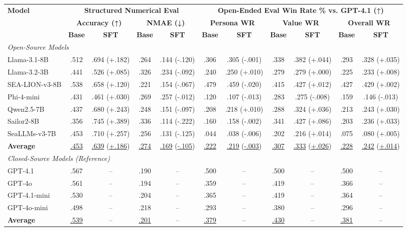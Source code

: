 \begin{tabular}{l|cc|cc|cc|cc|cc}
\toprule
\multirow{3}{*}{\textbf{Model}} & \multicolumn{4}{c|}{\textbf{Structured Numerical Eval}} & \multicolumn{6}{c}{\textbf{Open-Ended Eval Win Rate \% vs. GPT-4.1 (↑)}} \\
\cmidrule(lr){2-5} \cmidrule(lr){6-11}
& \multicolumn{2}{c|}{\textbf{Accuracy (↑)}} & \multicolumn{2}{c|}{\textbf{NMAE (↓)}} & \multicolumn{2}{c|}{\textbf{Persona WR}} & \multicolumn{2}{c|}{\textbf{Value WR}} & \multicolumn{2}{c}{\textbf{Overall WR}} \\
& \textbf{Base} & \textbf{SFT} & \textbf{Base} & \textbf{SFT} & \textbf{Base} & \textbf{SFT} & \textbf{Base} & \textbf{SFT} & \textbf{Base} & \textbf{SFT} \\
\midrule
\multicolumn{11}{l}{\textit{Open-Source Models}} \\
\midrule
Llama-3.1-8B & .512 & .694 (+.182) & .264 & .144 (-.120) & .306 & .305 (-.001) & .338 & .382 (+.044) & .293 & .328 (+.035) \\
Llama-3.2-3B & .441 & .526 (+.085) & .326 & .234 (-.092) & .240 & .250 (+.010) & .279 & .279 (+.000) & .225 & .233 (+.008) \\
SEA-LION-v3-8B & .538 & .658 (+.120) & .221 & .154 (-.067) & .479 & .459 (-.020) & .415 & .427 (+.012) & .427 & .429 (+.002) \\
Phi-4-mini & .431 & .461 (+.030) & .269 & .257 (-.012) & .120 & .107 (-.013) & .283 & .275 (-.008) & .159 & .146 (-.013) \\
Qwen2.5-7B & .437 & .680 (+.243) & .248 & .151 (-.097) & .208 & .218 (+.010) & .288 & .324 (+.036) & .213 & .243 (+.030) \\
Sailor2-8B & .356 & .745 (+.389) & .336 & .114 (-.222) & .160 & .158 (-.002) & .341 & .427 (+.086) & .203 & .236 (+.033) \\
SeaLLMs-v3-7B & .453 & .710 (+.257) & .256 & .131 (-.125) & .044 & .038 (-.006) & .202 & .216 (+.014) & .075 & .080 (+.005) \\
\midrule
\textbf{Average} & \underline{.453} & \underline{.639} (\underline{+.186}) & \underline{.274} & \underline{.169} (\underline{-.105}) & \underline{.222} & \underline{.219} (\underline{-.003}) & \underline{.307} & \underline{.333} (\underline{+.026}) & \underline{.228} & \underline{.242} (\underline{+.014}) \\
\midrule
\multicolumn{11}{l}{\textit{Closed-Source Models (Reference)}} \\
\midrule
GPT-4.1 & .567 & -- & .190 & -- & .500 & -- & .500 & -- & .500 & -- \\
GPT-4o & .561 & -- & .194 & -- & .359 & -- & .419 & -- & .366 & -- \\
GPT-4.1-mini & .530 & -- & .204 & -- & .365 & -- & .419 & -- & .364 & -- \\
GPT-4o-mini & .498 & -- & .218 & -- & .293 & -- & .380 & -- & .296 & -- \\
\midrule
\textbf{Average} & \underline{.539} & -- & \underline{.201} & -- & \underline{.379} & -- & \underline{.430} & -- & \underline{.381} & -- \\
\bottomrule
\end{tabular}

